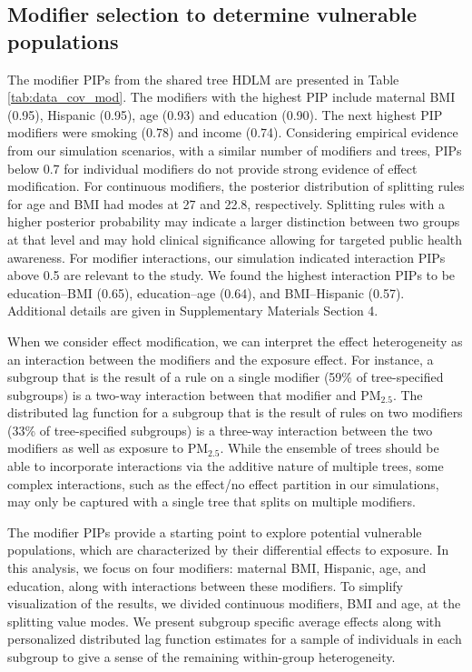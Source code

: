 \documentclass[12pt]{article}
\begin{document}
\subsection{Modifier selection to determine vulnerable populations}\label{sec:data_mod_sel}

The modifier PIPs from the shared tree HDLM are presented in Table \ref{tab:data_cov_mod}. The modifiers with the highest PIP include maternal BMI (0.95), Hispanic (0.95), age (0.93) and education (0.90). The next highest PIP modifiers were smoking (0.78) and income (0.74). Considering empirical evidence from our simulation scenarios, with a similar number of modifiers and trees, PIPs below 0.7 for individual modifiers do not provide strong evidence of effect modification. For continuous modifiers, the posterior distribution of splitting rules for age and BMI had modes at 27 and 22.8, respectively. Splitting rules with a higher posterior probability may indicate a larger distinction between two groups at that level and may hold clinical significance allowing for targeted public health awareness. For modifier interactions, our simulation indicated interaction PIPs above 0.5 are relevant to the study. We found the highest interaction PIPs to be education--BMI (0.65), education--age (0.64), and BMI--Hispanic (0.57). Additional details are given in Supplementary Materials Section 4.

When we consider effect modification, we can interpret the effect heterogeneity as an interaction between the modifiers and the exposure effect. For instance, a subgroup that is the result of a rule on a single modifier (59\% of tree-specified subgroups) is a two-way interaction between that modifier and PM$_{2.5}$. The distributed lag function for a subgroup that is the result of rules on two modifiers (33\% of tree-specified subgroups) is a three-way interaction between the two modifiers as well as exposure to PM$_{2.5}$. While the ensemble of trees should be able to incorporate interactions via the additive nature of multiple trees, some complex interactions, such as the effect/no effect partition in our simulations, may only be captured with a single tree that splits on multiple modifiers.

The modifier PIPs provide a starting point to explore potential vulnerable populations, which are characterized by their differential effects to exposure. In this analysis, we focus on four modifiers: maternal BMI, Hispanic, age, and education, along with interactions between these modifiers. To simplify visualization of the results, we divided continuous modifiers, BMI and age, at the splitting value modes. We present subgroup specific average effects along with personalized distributed lag function estimates for a sample of individuals in each subgroup to give a sense of the remaining within-group heterogeneity.
\end{document}
